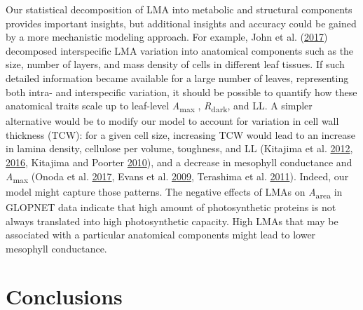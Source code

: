 \documentclass[
  12pt,
]{article}
\begin{document}
Our statistical decomposition of LMA into metabolic and structural components provides important insights, but additional insights and accuracy could be gained by a more mechanistic modeling approach.
For example, John et al. (\protect\hyperlink{ref-John2017}{2017}) decomposed interspecific LMA variation into anatomical components such as the size, number of layers, and mass density of cells in different leaf tissues.
If such detailed information became available for a large number of leaves, representing both intra- and interspecific variation, it should be possible to quantify how these anatomical traits scale up to leaf-level \emph{A}\textsubscript{max} , \emph{R}\textsubscript{dark}, and LL.
A simpler alternative would be to modify our model to account for variation in cell wall thickness (TCW): for a given cell size, increasing TCW would lead to an increase in lamina density, cellulose per volume, toughness, and LL (Kitajima et al. \protect\hyperlink{ref-Kitajima2012}{2012}, \protect\hyperlink{ref-Kitajima2016}{2016}, Kitajima and Poorter \protect\hyperlink{ref-Kitajima2010}{2010}), and a decrease in mesophyll conductance and \emph{A}\textsubscript{max} (Onoda et al. \protect\hyperlink{ref-Onoda2017}{2017}, Evans et al. \protect\hyperlink{ref-Evans2009}{2009}, Terashima et al. \protect\hyperlink{ref-Terashima2011}{2011}).
Indeed, our model might capture those patterns. The negative effects of LMAs on \emph{A}\textsubscript{area} in GLOPNET data indicate that high amount of photosynthetic proteins is not always translated into high photosynthetic capacity.
High LMAs that may be associated with a particular anatomical components might lead to lower mesophyll conductance.

\hypertarget{conclusions}{%
\section{Conclusions}\label{conclusions}}
\end{document}

